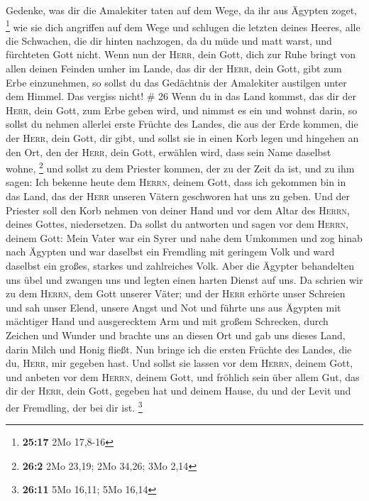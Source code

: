  Gedenke, was dir die Amalekiter taten auf dem Wege, da
ihr aus Ägypten zoget, \footnote{\textbf{25:17} 2Mo 17,8-16}
 wie sie dich angriffen auf dem Wege und schlugen die
letzten deines Heeres, alle die Schwachen, die dir hinten nachzogen, da
du müde und matt warst, und fürchteten Gott nicht.  Wenn
nun der \textsc{Herr}, dein Gott, dich zur Ruhe bringt von allen deinen
Feinden umher im Lande, das dir der \textsc{Herr}, dein Gott, gibt zum
Erbe einzunehmen, so sollst du das Gedächtnis der Amalekiter austilgen
unter dem Himmel. Das vergiss nicht! \# 26  Wenn du in das
Land kommst, das dir der \textsc{Herr}, dein Gott, zum Erbe geben wird,
und nimmst es ein und wohnst darin,  so sollst du nehmen
allerlei erste Früchte des Landes, die aus der Erde kommen, die der
\textsc{Herr}, dein Gott, dir gibt, und sollst sie in einen Korb legen
und hingehen an den Ort, den der \textsc{Herr}, dein Gott, erwählen
wird, dass sein Name daselbst wohne, \footnote{\textbf{26:2} 2Mo 23,19;
  2Mo 34,26; 3Mo 2,14}  und sollst zu dem Priester kommen,
der zu der Zeit da ist, und zu ihm sagen: Ich bekenne heute dem
\textsc{Herrn}, deinem Gott, dass ich gekommen bin in das Land, das der
\textsc{Herr} unseren Vätern geschworen hat uns zu geben. 
Und der Priester soll den Korb nehmen von deiner Hand und vor dem Altar
des \textsc{Herrn}, deines Gottes, niedersetzen.  Da
sollst du antworten und sagen vor dem \textsc{Herrn}, deinem Gott: Mein
Vater war ein Syrer und nahe dem Umkommen und zog hinab nach Ägypten und
war daselbst ein Fremdling mit geringem Volk und ward daselbst ein
großes, starkes und zahlreiches Volk.  Aber die Ägypter
behandelten uns übel und zwangen uns und legten einen harten Dienst auf
uns.  Da schrien wir zu dem \textsc{Herrn}, dem Gott
unserer Väter; und der \textsc{Herr} erhörte unser Schreien und sah
unser Elend, unsere Angst und Not  und führte uns aus
Ägypten mit mächtiger Hand und ausgerecktem Arm und mit großem
Schrecken, durch Zeichen und Wunder  und brachte uns an
diesen Ort und gab uns dieses Land, darin Milch und Honig fließt.
 Nun bringe ich die ersten Früchte des Landes, die du,
\textsc{Herr}, mir gegeben hast. Und sollst sie lassen vor dem
\textsc{Herrn}, deinem Gott, und anbeten vor dem \textsc{Herrn}, deinem
Gott,  und fröhlich sein über allem Gut, das dir der
\textsc{Herr}, dein Gott, gegeben hat und deinem Hause, du und der Levit
und der Fremdling, der bei dir ist. \footnote{\textbf{26:11} 5Mo 16,11;
  5Mo 16,14}

